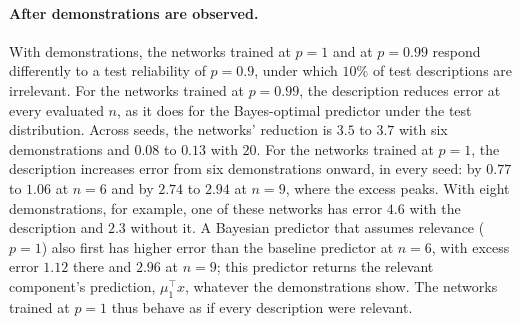 \paragraph{After demonstrations are observed.}
With demonstrations, the networks trained at $p = 1$ and at $p = 0.99$ respond differently to a test reliability of $p = 0.9$, under which $10\%$ of test descriptions are irrelevant. For the networks trained at $p = 0.99$, the description reduces error at every evaluated $n$, as it does for the Bayes-optimal predictor under the test distribution. Across seeds, the networks' reduction is $3.5$ to $3.7$ with six demonstrations and $0.08$ to $0.13$ with $20$. For the networks trained at $p = 1$, the description increases error from six demonstrations onward, in every seed: by $0.77$ to $1.06$ at $n = 6$ and by $2.74$ to $2.94$ at $n = 9$, where the excess peaks. With eight demonstrations, for example, one of these networks has error $4.6$ with the description and $2.3$ without it. A Bayesian predictor that assumes relevance ($p = 1$) also first has higher error than the baseline predictor at $n = 6$, with excess error $1.12$ there and $2.96$ at $n = 9$; this predictor returns the relevant component's prediction, $\mu_1^\top x$, whatever the demonstrations show. The networks trained at $p=1$ thus behave as if every description were relevant.

